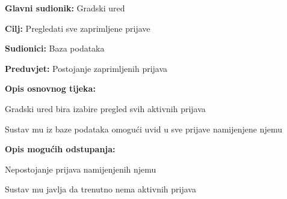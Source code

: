 					\noindent {}
					\begin{packed_item}
	
						\item \textbf{Glavni sudionik: }Gradski ured
						\item  \textbf{Cilj:} Pregledati sve zaprimljene prijave
						\item  \textbf{Sudionici:} Baza podataka
						\item  \textbf{Preduvjet:} Postojanje zaprimljenih prijava
						\item  \textbf{Opis osnovnog tijeka:}
						
						\item[] \begin{packed_enum}
	
							\item Gradski ured bira izabire pregled svih aktivnih prijava
							\item Sustav mu iz baze podataka omogući uvid u sve prijave namijenjene njemu
						\end{packed_enum}
						
						\item  \textbf{Opis mogućih odstupanja:}
						
						\item[] \begin{packed_item}
	
							\item[2.a] Nepostojanje prijava namijenjenih njemu
							\item[] \begin{packed_enum}
								
								\item Sustav mu javlja da trenutno nema aktivnih prijava	
							\end{packed_enum}
						\end{packed_item}
					\end{packed_item}
					
